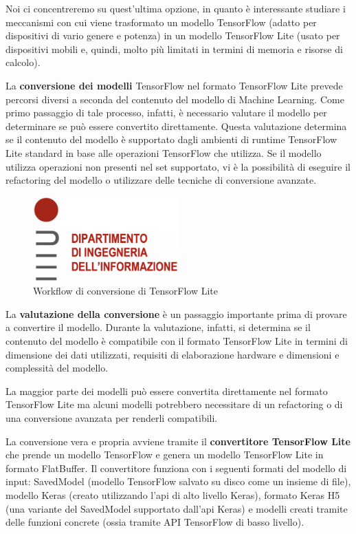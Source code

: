 Noi ci concentreremo su quest’ultima opzione, in quanto è interessante studiare i meccanismi con cui viene trasformato un modello TensorFlow
(adatto per dispositivi di vario genere e potenza) in un modello TensorFlow Lite (usato per dispositivi mobili e, quindi, molto più limitati in termini
di memoria e risorse di calcolo).

La \textbf{conversione dei modelli} TensorFlow nel formato TensorFlow Lite prevede percorsi diversi a seconda del contenuto del modello di Machine Learning.
Come primo passaggio di tale processo, infatti, è necessario valutare il modello per determinare se può essere convertito direttamente.
Questa valutazione determina se il contenuto del modello è supportato dagli ambienti di runtime TensorFlow Lite standard in base alle operazioni
TensorFlow che utilizza. Se il modello utilizza operazioni non presenti nel set supportato, vi è la possibilità di eseguire il refactoring del modello
o utilizzare delle tecniche di conversione avanzate.

\begin{figure}
    \centering
    \includegraphics[width=0.5\textwidth]{Immagini/logo_dei.png}
    \caption{Workflow di conversione di TensorFlow Lite}
    \label{fig:workflow}
\end{figure}

La \textbf{valutazione della conversione} è un passaggio importante prima di provare a convertire il modello. Durante la valutazione, infatti,
si determina se il contenuto del modello è compatibile con il formato TensorFlow Lite in termini di dimensione dei dati utilizzati, requisiti di
elaborazione hardware e dimensioni e complessità del modello. 

La maggior parte dei modelli può essere convertita direttamente nel formato TensorFlow Lite ma alcuni modelli potrebbero necessitare di un refactoring o
di una conversione avanzata per renderli compatibili.

La conversione vera e propria avviene tramite il \textbf{convertitore TensorFlow Lite} che prende un modello TensorFlow e genera un modello TensorFlow Lite
in formato FlatBuffer. Il convertitore funziona con i seguenti formati del modello di input: SavedModel (modello TensorFlow salvato su disco come un
insieme di file), modello Keras (creato utilizzando l’api di alto livello Keras), formato Keras H5 (una variante del SavedModel supportato dall’api Keras)
e modelli creati tramite delle funzioni concrete (ossia tramite API TensorFlow di basso livello).

